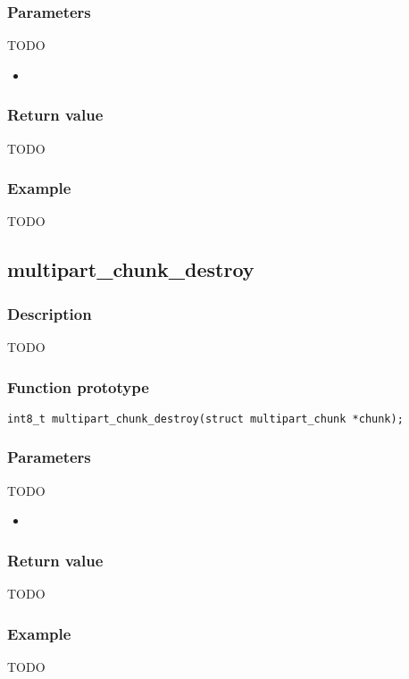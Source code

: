 \subsubsection*{Parameters}
TODO
\begin{itemize}[noitemsep]
\item \texttt{}
\end{itemize}
\subsubsection*{Return value}
TODO
\subsubsection*{Example}
TODO


\subsection{multipart\_chunk\_destroy}

\subsubsection*{Description}
TODO

\subsubsection*{Function prototype}
\texttt{int8\_t multipart\_chunk\_destroy(struct multipart\_chunk *chunk);}

\subsubsection*{Parameters}
TODO
\begin{itemize}[noitemsep]
\item \texttt{}
\end{itemize}
\subsubsection*{Return value}
TODO
\subsubsection*{Example}
TODO


